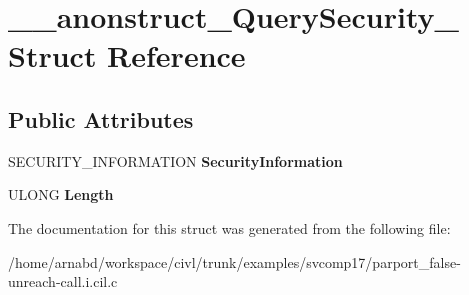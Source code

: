\hypertarget{struct____anonstruct__QuerySecurity__65}{}\section{\+\_\+\+\_\+anonstruct\+\_\+\+Query\+Security\+\_ Struct Reference}
\label{struct____anonstruct__QuerySecurity__65}
\subsection*{Public Attributes}
\begin{DoxyCompactItemize}
\item 
\hypertarget{struct____anonstruct__QuerySecurity__65_af03c175c8e38459227384584f2d68559}{}S\+E\+C\+U\+R\+I\+T\+Y\+\_\+\+I\+N\+F\+O\+R\+M\+A\+T\+I\+O\+N {\bfseries Security\+Information}\label{struct____anonstruct__QuerySecurity__65_af03c175c8e38459227384584f2d68559}

\item 
\hypertarget{struct____anonstruct__QuerySecurity__65_a76d36d82ab5de32e74199de14876fd3b}{}U\+L\+O\+N\+G {\bfseries Length}\label{struct____anonstruct__QuerySecurity__65_a76d36d82ab5de32e74199de14876fd3b}

\end{DoxyCompactItemize}


The documentation for this struct was generated from the following file\+:\begin{DoxyCompactItemize}
\item 
/home/arnabd/workspace/civl/trunk/examples/svcomp17/parport\+\_\+false-\/unreach-\/call.\+i.\+cil.\+c\end{DoxyCompactItemize}
